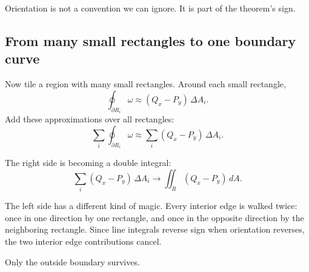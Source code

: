Orientation is not a convention we can ignore.  It is part of the theorem's sign.

\subsection{From many small rectangles to one boundary curve}

Now tile a region with many small rectangles.  Around each small rectangle,
\[
    \oint_{\partial R_i} \omega
    \approx
    (Q_x-P_y)\,\Delta A_i.
\]
Add these approximations over all rectangles:
\[
    \sum_i \oint_{\partial R_i}\omega
    \approx
    \sum_i (Q_x-P_y)\,\Delta A_i.
\]

The right side is becoming a double integral:
\[
    \sum_i (Q_x-P_y)\,\Delta A_i
    \longrightarrow
    \iint_R (Q_x-P_y)\,dA.
\]

The left side has a different kind of magic.  Every interior edge is walked twice: once
in one direction by one rectangle, and once in the opposite direction by the neighboring
rectangle.  Since line integrals reverse sign when orientation reverses, the two interior
edge contributions cancel.

Only the outside boundary survives.

